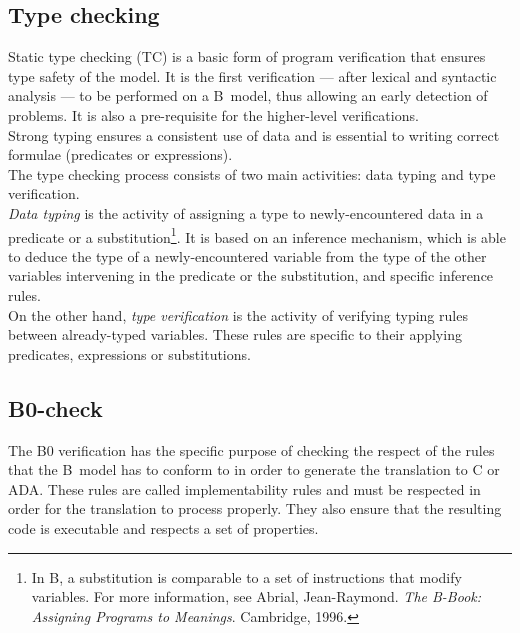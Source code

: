 \documentclass{article}
\begin{document}
\subsection{Type checking}
Static type checking (TC) is a basic form of program verification that ensures type safety of the model. It is the first verification --- after lexical and syntactic analysis --- to be performed on a B~model, thus allowing an early detection of problems. It is also a pre-requisite for the higher-level verifications. \\
Strong typing ensures a consistent use of data and is essential to writing correct formulae (predicates or expressions).\\

The type checking process consists of two main activities: data typing and type verification.\\
{\itshape Data typing} is the activity of assigning a type to newly-encountered data in a predicate or a substitution\footnote{In B, a substitution is comparable to a set of instructions that modify variables. For more information, see Abrial, Jean-Raymond. {\itshape The B-Book: Assigning Programs to Meanings}. Cambridge, 1996.}. It is based on an inference mechanism, which is able to deduce the type of a newly-encountered variable from the type of the other variables intervening in the predicate or the substitution, and specific inference rules.\\
On the other hand, {\itshape type verification} is the activity of verifying typing rules between already-typed variables. These rules are specific to their applying predicates, expressions or substitutions.

\subsection{B0-check}
The B0 verification has the specific purpose of checking the respect of the rules that the B~model has to conform to in order to generate the translation to C or ADA. These rules are called implementability rules and must be respected in order for the translation to process properly. They also ensure that the resulting code is executable and respects a set of properties.
\end{document}

